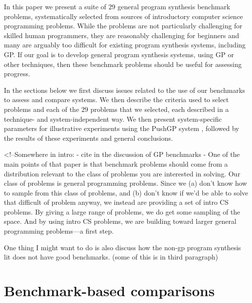 \documentclass{sig-alternate}
\begin{document}
In this paper we present a suite of $29$ general program synthesis benchmark problems, systematically selected from sources of introductory computer science programming problems. While the problems are not particularly challenging for skilled human programmers, they are reasonably challenging for beginners and many are arguably too difficult for existing program synthesis systems, including GP. If our goal is to develop general program synthesis systems, using GP or other techniques, then these benchmark problems should be useful for assessing progress.

In the sections below we first discuss issues related to the use of our benchmarks to assess and compare systems. We then describe the criteria used to select problems and each of the $29$ problems that we selected, each described in a technique- and system-independent way. We then present system-specific parameters for illustrative experiments using the PushGP system \cite{spector:2002:GPEM, 1068292}, followed by the results of these experiments and general conclusions.




<!--Somewhere in intro:
- cite \cite{Woodward:2014:GECCOcomp} in the discussion of GP benchmarks
- One of the main points of that paper is that benchmark problems should come from a distribution relevant to the class of problems you are interested in solving. Our class of problems is general programming problems. Since we (a) don't know how to sample from this class of problems, and (b) don't know if we'd be able to solve that difficult of problem anyway, we instead are providing a set of intro CS problems. By giving a large range of problems, we do get some sampling of the space. And by using intro CS problems, we are building toward larger general programming problems---a first step.

One thing I might want to do is also discuss how the non-gp program synthesis lit does not have good benchmarks. (some of this is in third paragraph)


\section{Benchmark-based comparisons}
\end{document}
